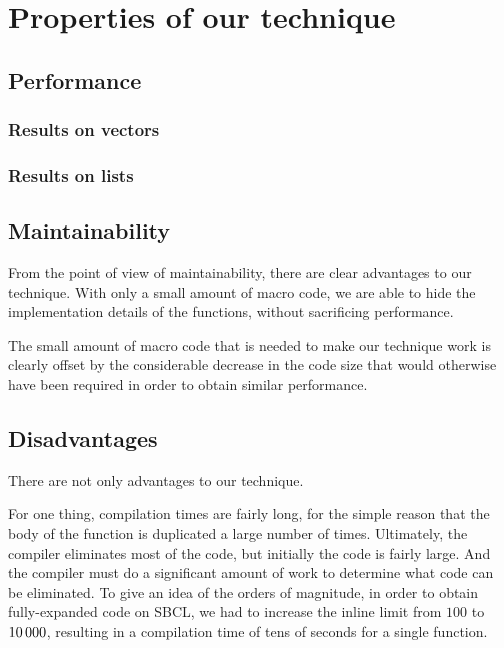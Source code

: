 \section{Properties of our technique}

\subsection{Performance}

\subsubsection{Results on vectors}

\subsubsection{Results on lists}

\subsection{Maintainability}

From the point of view of maintainability, there are clear advantages
to our technique.  With only a small amount of macro code, we are able
to hide the implementation details of the functions, without
sacrificing performance.

The small amount of macro code that is needed to make our technique
work is clearly offset by the considerable decrease in the code size
that would otherwise have been required in order to obtain similar
performance.

\subsection{Disadvantages}

There are not only advantages to our technique.

For one thing, compilation times are fairly long, for the simple
reason that the body of the function is duplicated a large number of
times.  Ultimately, the compiler eliminates most of the code, but
initially the code is fairly large.  And the compiler must do a
significant amount of work to determine what code can be eliminated.
To give an idea of the orders of magnitude, in order to obtain
fully-expanded code on SBCL, we had to increase the inline limit from
$100$ to $10\thinspace000$, resulting in a compilation time of tens of
seconds for a single function.

